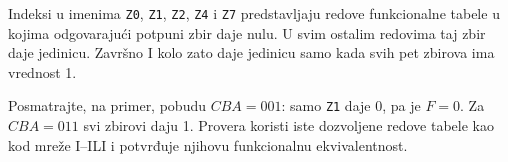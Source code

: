 
Indeksi u imenima \texttt{Z0}, \texttt{Z1}, \texttt{Z2}, \texttt{Z4} i \texttt{Z7} predstavljaju redove funkcionalne tabele u kojima odgovarajući potpuni zbir daje nulu. U svim ostalim redovima taj zbir daje jedinicu. Završno I kolo zato daje jedinicu samo kada svih pet zbirova ima vrednost 1.

Posmatrajte, na primer, pobudu \(CBA=001\): samo \texttt{Z1} daje 0, pa je \(F=0\). Za \(CBA=011\) svi zbirovi daju 1. Provera koristi iste dozvoljene redove tabele kao kod mreže I–ILI i potvrđuje njihovu funkcionalnu ekvivalentnost.
